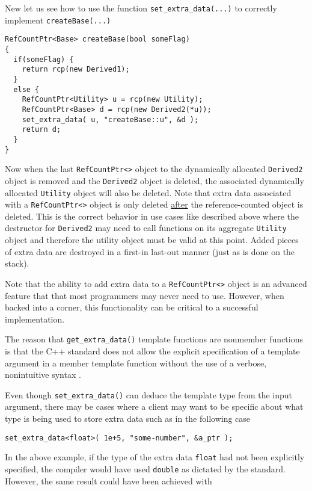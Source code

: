 New let us see how to use the function {}\texttt{set\-\_extra\-\_data(...)}
to correctly implement {}\texttt{create\-Base(...)}

{\scriptsize\begin{verbatim}
RefCountPtr<Base> createBase(bool someFlag)
{
  if(someFlag) {
    return rcp(new Derived1);
  }
  else {
    RefCountPtr<Utility> u = rcp(new Utility);
    RefCountPtr<Base> d = rcp(new Derived2(*u));
    set_extra_data( u, "createBase::u", &d );
    return d;
  }
}
\end{verbatim}}

{}\noindent{}Now when the last {}\texttt{Ref\-Count\-Ptr<>} object to the
dynamically allocated {}\texttt{Derived2} object is removed and the
{}\texttt{Derived2} object is deleted, the associated dynamically
allocated {}\texttt{Utility} object will also be deleted.  Note that
extra data associated with a {}\texttt{Ref\-Count\-Ptr<>} object is only
deleted \underline{after} the reference-counted object is deleted.
This is the correct behavior in use cases like described above where
the destructor for {}\texttt{Derived2} may need to call functions on
its aggregate {}\texttt{Utility} object and therefore the utility
object must be valid at this point.  Added pieces of extra data are
destroyed in a first-in last-out manner (just as is done on the
stack).

Note that the ability to add extra data to a
{}\texttt{Ref\-Count\-Ptr<>} object is an advanced feature that that
most programmers may never need to use.  However, when backed into a
corner, this functionality can be critical to a successful
implementation.

The reason that {}\texttt{get\-\_extra\-\_data()} template functions
are nonmember functions is that the C++ standard does not allow the
explicit specification of a template argument in a member template
function without the use of a verbose, nonintuitive syntax
{}\cite[C.13.6]{ref:stroustrup_2000}.

Even though {}\texttt{set\-\_extra\-\_data()} can deduce the template
type from the input argument, there may be cases where a client may
want to be specific about what type is being used to store extra data
such as in the following case

{\scriptsize\begin{verbatim}
set_extra_data<float>( 1e+5, "some-number", &a_ptr );
\end{verbatim}}

{}\noindent{}In the above example, if the type of the extra data
{}\texttt{float} had not been explicitly specified, the compiler would
have used {}\texttt{double} as dictated by the standard.  However, the
same result could have been achieved with

